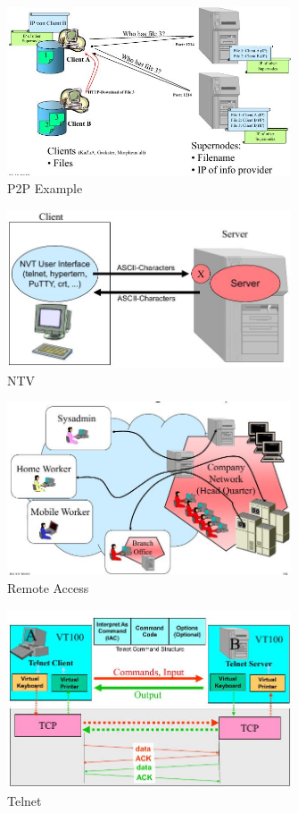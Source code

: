 \documentclass[ngerman,a4paper,12pt]{scrreprt}
\begin{document}
\begin{figure}[H]
	\centering
	\includegraphics[width=0.75\textwidth]{img/V13.6.jpg}
	\caption{P2P Example}
	\label{}
\end{figure}

\begin{figure}[H]
	\centering
	\includegraphics[width=0.75\textwidth]{img/V13.7.jpg}
	\caption{NTV}
	\label{}
\end{figure}

\begin{figure}[H]
	\centering
	\includegraphics[width=0.75\textwidth]{img/V13.8.jpg}
	\caption{Remote Access}
	\label{}
\end{figure}

\begin{figure}[H]
	\centering
	\includegraphics[width=0.75\textwidth]{img/V13.10.jpg}
	\caption{Telnet}
	\label{}
\end{figure}
\end{document}
